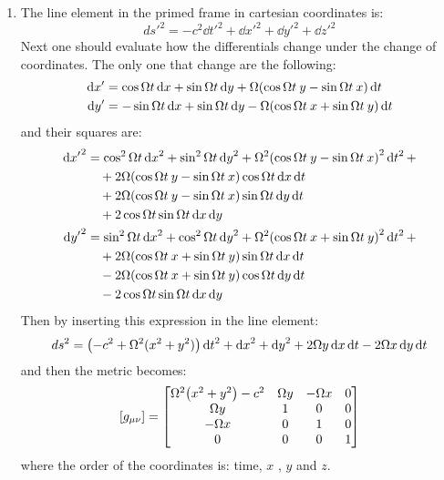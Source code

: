 \documentclass[11pt, oneside]{article}
\begin{document}
\begin{enumerate}
\item The line element in the primed frame in cartesian coordinates is:
\[
	ds'^2 = -c^2\dd{t}'^2 + \dd{x}'^2 + \dd{y} '^2 + \dd{z}'^2
\]
Next one should evaluate how the differentials change under the change of coordinates. The only one that change are the following:
\begin{align*}
	\dd{x'} &= \cos\Omega t \dd{x} + \sin\Omega t \dd{y} + \Omega \qty(\cos\Omega t \:y - \sin \Omega t\:x) \dd{t} \\
	\dd{y'} &= -\sin\Omega t \dd{x} + \sin\Omega t \dd{y} - \Omega \qty(\cos\Omega t \:x + \sin \Omega t\:y) \dd{t}
\end{align*}
and their squares are:
\begin{align*}
	\dd{x'}^2 &= \cos^2\Omega t  \dd{x}^2 + \sin^2 \Omega t \dd{y}^2 + \Omega^2 \qty(\cos\Omega t \:y - \sin \Omega t\:x)^2 \dd{t}^2 + \\
	& \quad + 2\Omega\qty(\cos\Omega t \:y - \sin \Omega t\:x) \cos\Omega t \dd{x} \dd{t} \\
	& \quad + 2\Omega\qty(\cos\Omega t \:y - \sin \Omega t\:x) \sin\Omega t \dd{y} \dd{t} \\
	& \quad + 2 \cos\Omega t \sin\Omega t \dd{x} \dd{y} \\
	\dd{y'}^2 &= \sin^2 \Omega t  \dd{x}^2 + \cos^2\Omega t \dd{y}^2 + \Omega^2 \qty(\cos\Omega t \:x + \sin \Omega t\:y)^2 \dd{t}^2 +\\
	& \quad + 2\Omega\qty(\cos\Omega t \:x + \sin \Omega t\:y)  \sin\Omega t \dd{x} \dd{t}  \\
	& \quad - 2\Omega\qty(\cos\Omega t \:x + \sin \Omega t\:y) \cos\Omega t \dd{y} \dd{t}\\
	& \quad - 2 \cos\Omega t \sin\Omega t \dd{x} \dd{y} \\
\end{align*}
Then by inserting this expression in the line element:
\[
	d s^2 = \qty(-c^2 + \Omega^2(x^2 + y^2)) \dd{t}^2 + \dd{x}^2 + \dd{y}^2 + 2 \Omega y \dd{x} \dd{t} - 2 \Omega x  \dd{y} \dd{t} 
\]
and then the metric becomes:
\[
	\qty[g_{\mu\nu}] = 
	\begin{bmatrix}
		\Omega^2\qty(x^2 + y^2) - c^2 & \Omega y & -\Omega x & 0 \\
		\Omega y & 1 & 0 & 0 \\
		-\Omega x & 0 & 1 & 0 \\
		0 & 0 & 0 & 1 \\
	\end{bmatrix}
\]
where the order of the coordinates is: time, $x$ , $y$ and $z$.


\end{enumerate}
\end{document}
